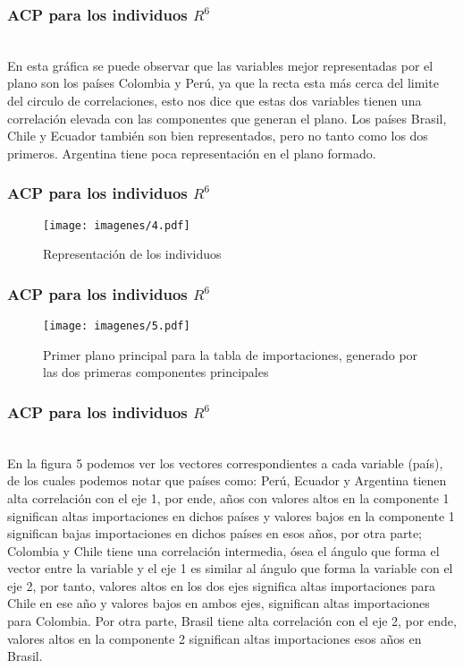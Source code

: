 \documentclass[12pt]{beamer}
\begin{document}
\begin{frame}
\frametitle{ACP para los individuos $R^6$}
~\\En esta gráfica se puede observar que las variables mejor representadas por el plano son los países Colombia y Perú, ya que la recta esta más cerca del limite del circulo de correlaciones, esto nos dice que estas dos variables tienen una correlación elevada con las componentes que generan el plano. Los países Brasil, Chile y Ecuador también son bien representados, pero no tanto como los dos primeros. Argentina tiene poca representación en el plano formado.
\end{frame}

\begin{frame}
\frametitle{ACP para los individuos $R^6$}
\begin{figure}[h!]
  \centering
  \texttt{[image: imagenes/4.pdf]}
  \caption{Representación de los individuos}\label{figura1}
\end{figure}
\end{frame}

\begin{frame}
\frametitle{ACP para los individuos $R^6$}
\begin{figure}[h]
  \centering
  \texttt{[image: imagenes/5.pdf]}
  \caption{Primer plano principal para la tabla de importaciones, generado por las dos
primeras componentes principales}\label{figura1}
\end{figure}
\end{frame}

\begin{frame}
\frametitle{ACP para los individuos $R^6$}
~\\En la figura 5 podemos ver los vectores correspondientes a cada variable (país), de los cuales podemos notar que países como: Perú, Ecuador y Argentina tienen alta correlación con el eje 1, por ende, años con valores altos en la componente 1 significan altas importaciones en dichos países y valores bajos en la componente 1 significan bajas importaciones en dichos países en esos años, por otra parte; Colombia y Chile tiene una correlación intermedia, ósea el ángulo que forma el vector entre la variable y el eje 1 es similar al ángulo que forma la variable con el eje 2, por tanto, valores altos en los dos ejes significa altas importaciones para Chile en ese año y valores bajos en ambos ejes, significan altas importaciones para Colombia. Por otra parte, Brasil tiene alta correlación con el eje 2, por ende, valores altos en la componente 2 significan altas importaciones esos años en Brasil.
\end{frame}
\end{document}
